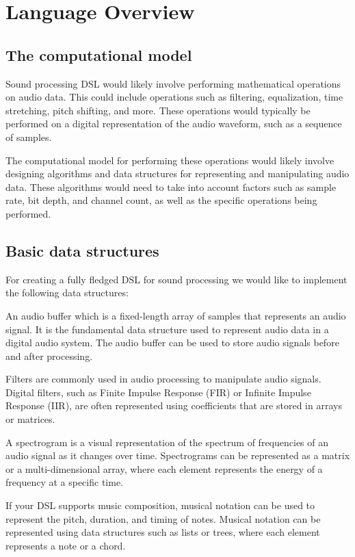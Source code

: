 \chapter{Language Overview}


\section{The computational model}
Sound processing DSL would likely involve performing 
mathematical operations on audio data. This could include 
operations such as filtering, equalization, time stretching, pitch 
shifting, and more. These operations would typically be performed 
on a digital representation of the audio waveform, such as a 
sequence of samples.

The computational model for performing these operations would 
likely involve designing algorithms and data structures for 
representing and manipulating audio data. These algorithms would 
need to take into account factors such as sample rate, bit depth, 
and channel count, as well as the specific operations being 
performed.

\section{Basic data structures}
For creating a fully fledged DSL for sound processing we would like 
to implement the following data structures: 

An audio buffer which is a fixed-length array of samples that 
represents an audio signal. It is the fundamental data structure 
used to represent audio data in a digital audio system. The audio 
buffer can be used to store audio signals before and after 
processing.

Filters are commonly used in audio processing to manipulate audio 
signals. Digital filters, such as Finite Impulse Response (FIR) or 
Infinite Impulse Response (IIR), are often represented using 
coefficients that are stored in arrays or matrices.

A spectrogram is a visual representation of the spectrum of 
frequencies of an audio signal as it changes over time. Spectrograms 
can be represented as a matrix or a multi-dimensional array, where 
each element represents the energy of a frequency at a specific 
time.

If your DSL supports music composition, musical notation can be 
used to represent the pitch, duration, and timing of notes. Musical 
notation can be represented using data structures such as lists or 
trees, where each element represents a note or a chord.

